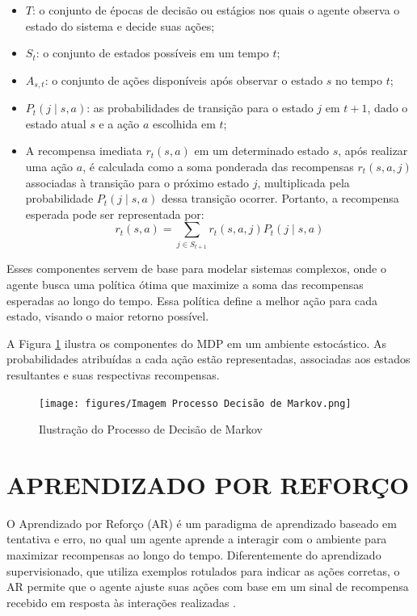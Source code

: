 \documentclass[
    12pt,                %
    openright,           %
    oneside,             %
    a4paper,             %
    english,             %
    spanish,             %
    brazil               %
]{ufscar}
\begin{document}
\begin{itemize}
    \item \( T \): o conjunto de épocas de decisão ou estágios nos quais o agente observa o estado do sistema e decide suas ações;
    \item \( S_t \): o conjunto de estados possíveis em um tempo \( t \);
    \item \( A_{s,t} \): o conjunto de ações disponíveis após observar o estado \( s \) no tempo \( t \);
    \item \( P_t (j \mid s, a) \): as probabilidades de transição para o estado \( j \) em \( t+1 \), dado o estado atual \( s \) e a ação \( a \) escolhida em \( t \);
    \item A recompensa imediata \( r_t (s,a) \) em um determinado estado \( s \), após realizar uma ação \( a \), é calculada como a soma ponderada das recompensas \( r_t (s,a,j) \) associadas à transição para o próximo estado \( j \), multiplicada pela probabilidade \( P_t (j \mid s,a) \) dessa transição ocorrer. Portanto, a recompensa esperada pode ser representada por:
    \begin{equation}
        r_t\left(s,a\right) = \sum_{j \in S_{t+1}} r_t\left(s,a,j\right)P_t\left(j \mid s,a\right)
    \end{equation}
\end{itemize}

Esses componentes servem de base para modelar sistemas complexos, onde o agente busca uma política ótima que maximize a soma das recompensas esperadas ao longo do tempo. Essa política define a melhor ação para cada estado, visando o maior retorno possível.

A Figura \ref{figure:markov} ilustra os componentes do MDP em um ambiente estocástico. As probabilidades atribuídas a cada ação estão representadas, associadas aos estados resultantes e suas respectivas recompensas.

\begin{figure}[hbt]
\centering
  \caption{Ilustração do Processo de Decisão de Markov} 
  \label{figure:markov}
  \texttt{[image: figures/Imagem Processo Decisão de Markov.png]} 
\end{figure}


\section{APRENDIZADO POR REFORÇO}

O Aprendizado por Reforço (AR) é um paradigma de aprendizado baseado em tentativa e erro, no qual um agente aprende a interagir com o ambiente para maximizar recompensas ao longo do tempo. Diferentemente do aprendizado supervisionado, que utiliza exemplos rotulados para indicar as ações corretas, o AR permite que o agente ajuste suas ações com base em um sinal de recompensa recebido em resposta às interações realizadas \cite{sutton_reinforcement_2014}.
\end{document}
